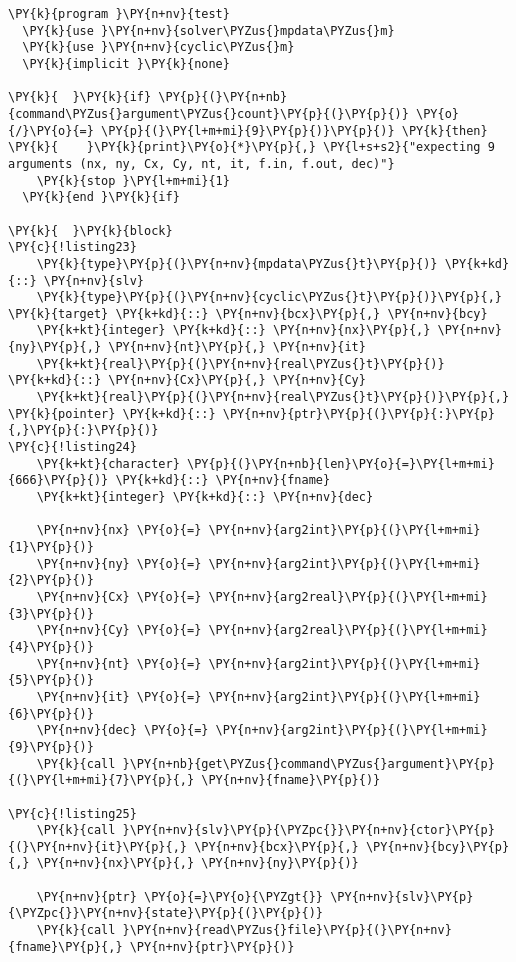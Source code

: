 \begin{Verbatim}[commandchars=\\\{\}]
\PY{k}{program }\PY{n+nv}{test}
  \PY{k}{use }\PY{n+nv}{solver\PYZus{}mpdata\PYZus{}m}
  \PY{k}{use }\PY{n+nv}{cyclic\PYZus{}m}
  \PY{k}{implicit }\PY{k}{none}

\PY{k}{  }\PY{k}{if} \PY{p}{(}\PY{n+nb}{command\PYZus{}argument\PYZus{}count}\PY{p}{(}\PY{p}{)} \PY{o}{/}\PY{o}{=} \PY{p}{(}\PY{l+m+mi}{9}\PY{p}{)}\PY{p}{)} \PY{k}{then}
\PY{k}{    }\PY{k}{print}\PY{o}{*}\PY{p}{,} \PY{l+s+s2}{"expecting 9 arguments (nx, ny, Cx, Cy, nt, it, f.in, f.out, dec)"}
    \PY{k}{stop }\PY{l+m+mi}{1}
  \PY{k}{end }\PY{k}{if}

\PY{k}{  }\PY{k}{block}
\PY{c}{!listing23}
    \PY{k}{type}\PY{p}{(}\PY{n+nv}{mpdata\PYZus{}t}\PY{p}{)} \PY{k+kd}{::} \PY{n+nv}{slv}
    \PY{k}{type}\PY{p}{(}\PY{n+nv}{cyclic\PYZus{}t}\PY{p}{)}\PY{p}{,} \PY{k}{target} \PY{k+kd}{::} \PY{n+nv}{bcx}\PY{p}{,} \PY{n+nv}{bcy}
    \PY{k+kt}{integer} \PY{k+kd}{::} \PY{n+nv}{nx}\PY{p}{,} \PY{n+nv}{ny}\PY{p}{,} \PY{n+nv}{nt}\PY{p}{,} \PY{n+nv}{it}
    \PY{k+kt}{real}\PY{p}{(}\PY{n+nv}{real\PYZus{}t}\PY{p}{)} \PY{k+kd}{::} \PY{n+nv}{Cx}\PY{p}{,} \PY{n+nv}{Cy}
    \PY{k+kt}{real}\PY{p}{(}\PY{n+nv}{real\PYZus{}t}\PY{p}{)}\PY{p}{,} \PY{k}{pointer} \PY{k+kd}{::} \PY{n+nv}{ptr}\PY{p}{(}\PY{p}{:}\PY{p}{,}\PY{p}{:}\PY{p}{)}
\PY{c}{!listing24}
    \PY{k+kt}{character} \PY{p}{(}\PY{n+nb}{len}\PY{o}{=}\PY{l+m+mi}{666}\PY{p}{)} \PY{k+kd}{::} \PY{n+nv}{fname}
    \PY{k+kt}{integer} \PY{k+kd}{::} \PY{n+nv}{dec}

    \PY{n+nv}{nx} \PY{o}{=} \PY{n+nv}{arg2int}\PY{p}{(}\PY{l+m+mi}{1}\PY{p}{)}
    \PY{n+nv}{ny} \PY{o}{=} \PY{n+nv}{arg2int}\PY{p}{(}\PY{l+m+mi}{2}\PY{p}{)}
    \PY{n+nv}{Cx} \PY{o}{=} \PY{n+nv}{arg2real}\PY{p}{(}\PY{l+m+mi}{3}\PY{p}{)}
    \PY{n+nv}{Cy} \PY{o}{=} \PY{n+nv}{arg2real}\PY{p}{(}\PY{l+m+mi}{4}\PY{p}{)}
    \PY{n+nv}{nt} \PY{o}{=} \PY{n+nv}{arg2int}\PY{p}{(}\PY{l+m+mi}{5}\PY{p}{)}
    \PY{n+nv}{it} \PY{o}{=} \PY{n+nv}{arg2int}\PY{p}{(}\PY{l+m+mi}{6}\PY{p}{)}
    \PY{n+nv}{dec} \PY{o}{=} \PY{n+nv}{arg2int}\PY{p}{(}\PY{l+m+mi}{9}\PY{p}{)}
    \PY{k}{call }\PY{n+nb}{get\PYZus{}command\PYZus{}argument}\PY{p}{(}\PY{l+m+mi}{7}\PY{p}{,} \PY{n+nv}{fname}\PY{p}{)}

\PY{c}{!listing25}
    \PY{k}{call }\PY{n+nv}{slv}\PY{p}{\PYZpc{}}\PY{n+nv}{ctor}\PY{p}{(}\PY{n+nv}{it}\PY{p}{,} \PY{n+nv}{bcx}\PY{p}{,} \PY{n+nv}{bcy}\PY{p}{,} \PY{n+nv}{nx}\PY{p}{,} \PY{n+nv}{ny}\PY{p}{)}

    \PY{n+nv}{ptr} \PY{o}{=}\PY{o}{\PYZgt{}} \PY{n+nv}{slv}\PY{p}{\PYZpc{}}\PY{n+nv}{state}\PY{p}{(}\PY{p}{)} 
    \PY{k}{call }\PY{n+nv}{read\PYZus{}file}\PY{p}{(}\PY{n+nv}{fname}\PY{p}{,} \PY{n+nv}{ptr}\PY{p}{)}


\end{Verbatim}
